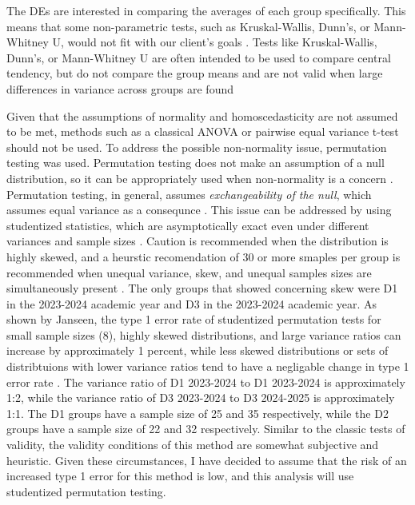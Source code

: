 \documentclass{article}
\begin{document}
The DEs are interested in comparing the averages of each group specifically. This means that some non-parametric tests, such as Kruskal-Wallis, Dunn's, or Mann-Whitney U, would not fit with our client's goals \cite{kroeger2021misuse}. Tests like Kruskal-Wallis, Dunn's, or Mann-Whitney U are often intended to be used to compare central tendency, but do not compare the group means and are not valid when large differences in variance across groups are found \cite{kroeger2021misuse}

Given that the assumptions of normality and homoscedasticity are not assumed to be met, methods such as a classical ANOVA or pairwise equal variance t-test should not be used. To address the possible non-normality issue, permutation testing was used. Permutation testing does not make an assumption of a null distribution, so it can be appropriately used when non-normality is a concern \cite{chung2013permutation}\cite{janssen1997studentized}\cite{noguchi2021permutation}\cite{karch2021choosing}. Permutation testing, in general, assumes \emph{exchangeability of the null}, which assumes equal variance as a consequnce \cite{chung2013permutation}\cite{janssen1997studentized}\cite{noguchi2021permutation}\cite{karch2021choosing}. This issue can be addressed by using studentized statistics, which are asymptotically exact even under different variances and sample sizes \cite{chung2013permutation}\cite{janssen1997studentized}\cite{noguchi2021permutation}\cite{karch2021choosing}. Caution is recommended when the distribution is highly skewed, and a heurstic recomendation of 30 or more smaples per group is recommended when unequal variance, skew, and unequal samples sizes are simultaneously present \cite{karch2021choosing}. The only groups that showed concerning skew were D1 in the 2023-2024 academic year and D3 in the 2023-2024 academic year. As shown by Janseen, the type 1 error rate of studentized permutation tests for small sample sizes (8), highly skewed distributions, and large variance ratios can increase by approximately 1 percent, while less skewed distributions or sets of distribtuions with lower variance ratios tend to have a negligable change in type 1 error rate \cite{janssen1997studentized}.
The variance ratio of D1 2023-2024 to D1 2023-2024 is approximately 1:2, while the variance ratio of D3 2023-2024 to D3 2024-2025 is approximately 1:1. The D1 groups have a sample size of 25 and 35 respectively, while the D2 groups have a sample size of 22 and 32 respectively. Similar to the classic tests of validity, the validity conditions of this method are somewhat subjective and heuristic. Given these circumstances, I have decided to assume that the risk of an increased type 1 error for this method is low, and this analysis will use studentized permutation testing. 
    
\end{document}
